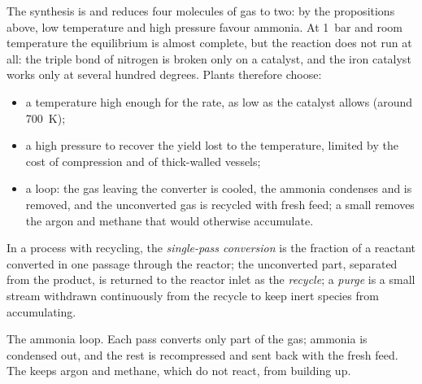 The synthesis is  and reduces four molecules of gas to two: by
the propositions above, low temperature and high pressure favour ammonia.
At \qty{1}{bar} and room temperature the equilibrium is almost complete, but
the reaction does not run at all: the triple bond of nitrogen is broken only
on a catalyst, and the iron catalyst works only at several hundred
degrees. Plants therefore choose:
\begin{itemize}
  \item a temperature high enough for the rate, as low as the catalyst allows
        (around \qty{700}{K});
  \item a high pressure to recover the yield lost to the temperature, limited
        by the cost of compression and of thick-walled vessels;
  \item a loop: the gas leaving the converter is cooled, the ammonia condenses
        and is removed, and the unconverted gas is recycled with fresh feed;
        a small  removes the argon and methane that would otherwise
        accumulate.
\end{itemize}

\begin{definition}\label{def:b2:equilibrium-shifts:single-pass}
In a process with recycling, the \emph{single-pass conversion}
is the fraction of a reactant converted in one passage through
the reactor; the unconverted part, separated from the product, is returned
to the reactor inlet as the \emph{recycle}; a
\emph{purge} is a small stream withdrawn continuously from the
recycle to keep inert species from accumulating.
\end{definition}

\begin{omfigure}

{\small The ammonia loop. Each pass converts only part of the gas; ammonia
is condensed out, and the rest is recompressed and sent back with the fresh
feed. The  keeps argon and methane, which do not react, from building
up.}
\end{omfigure}

